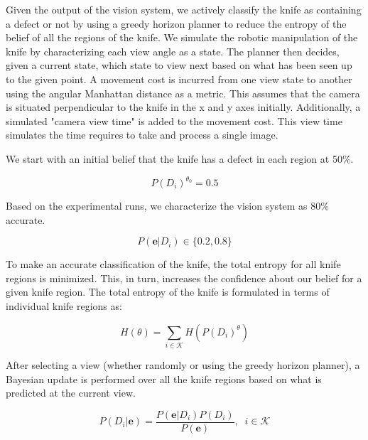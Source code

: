 \documentclass[letterpaper, 10 pt, conference]{ieeeconf}  %
\begin{document}
Given the output of the vision system, we actively classify the knife as containing a defect or not by using a greedy horizon planner to reduce the entropy of the belief of all the regions of the knife. We simulate the robotic manipulation of the knife by characterizing each view angle as a state. The planner then decides, given a current state, which state to view next based on what has been seen up to the given point. A movement cost is incurred from one view state to another using the angular Manhattan distance as a metric. This assumes that the camera is situated perpendicular to the knife in the x and y axes initially. Additionally, a simulated "camera view time" is added to the movement cost. This view time simulates the time requires to take and process a single image.

We start with an initial belief that the knife has a defect in each region at 50\%.

\begin{equation*}
    P(D_i)^{\theta_0} = 0.5 \label{eq: initDist}
\end{equation*}

Based on the experimental runs, we characterize the vision system as 80\% accurate.

\begin{equation*}
    P(\mathbf{e}|D_i) \in \{0.2,0.8\} \label{eq:initVisionAccuracy}
\end{equation*}

To make an accurate classification of the knife, the total entropy for all knife regions is minimized. This, in turn, increases the confidence about our belief for a given knife region. The total entropy of the knife is formulated in terms of individual knife regions as:

\begin{equation}
    H(\theta) = \sum_{i\in\mathcal{K}} H(P(D_i)^\theta) \label{eq: totalKnifeEntropyDist}
\end{equation}


After selecting a view (whether randomly or using the greedy horizon planner), a Bayesian update is performed over all the knife regions based on what is predicted at the current view.

\begin{equation}
    P(D_i|\mathbf{e}) = \frac{P(\mathbf{e}|D_i) P(D_i)}{P(\mathbf{e})}, \;\;i\in \mathcal{K}  \label{eq: bayesianUpdate}
\end{equation}
\end{document}
